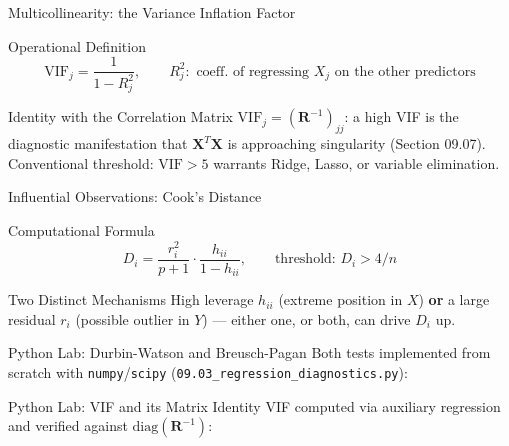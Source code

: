 \documentclass[10pt, aspectratio=169]{beamer}
\begin{document}
\begin{frame}{Multicollinearity: the Variance Inflation Factor}
  \footnotesize
  \begin{block}{Operational Definition}
    $$\text{VIF}_j=\frac{1}{1-R_j^2}, \qquad R_j^2: \text{ coeff. of regressing } X_j \text{ on the other predictors}$$
  \end{block}
  \pause

  \vspace{0.1cm}
  \begin{alertblock}{Identity with the Correlation Matrix}
    $\text{VIF}_j=(\mathbf{R}^{-1})_{jj}$: a high VIF is the diagnostic manifestation that $\mathbf{X}^T\mathbf{X}$ is approaching singularity (Section 09.07). Conventional threshold: $\text{VIF}>5$ warrants Ridge, Lasso, or variable elimination.
  \end{alertblock}
\end{frame}

\begin{frame}{Influential Observations: Cook's Distance}
  \footnotesize
  \begin{block}{Computational Formula}
    $$D_i=\frac{r_i^2}{p+1}\cdot\frac{h_{ii}}{1-h_{ii}}, \qquad \text{threshold: } D_i>4/n$$
  \end{block}
  \pause

  \vspace{0.1cm}
  \begin{alertblock}{Two Distinct Mechanisms}
    High leverage $h_{ii}$ (extreme position in $X$) \textbf{or} a large residual $r_i$ (possible outlier in $Y$) --- either one, or both, can drive $D_i$ up.
  \end{alertblock}
\end{frame}

\begin{frame}[fragile]{Python Lab: Durbin-Watson and Breusch-Pagan}
  \scriptsize
  Both tests implemented from scratch with \texttt{numpy}/\texttt{scipy} (\texttt{09.03\_regression\_diagnostics.py}):
  {
  }
\end{frame}

\begin{frame}[fragile]{Python Lab: VIF and its Matrix Identity}
  \scriptsize
  VIF computed via auxiliary regression and verified against $\text{diag}(\mathbf{R}^{-1})$:
  {
  }
\end{frame}
\end{document}
